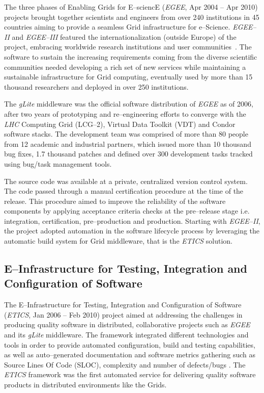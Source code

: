 \documentclass[journal]{IEEEtran}
\begin{document}
The three phases of Enabling Grids for E--sciencE ({\sl EGEE}, Apr 2004 -- Apr 2010)
\cite{cordis:egee,cordis:egee2,cordis:egee3} projects brought together
scientists and engineers from over 240 institutions in 45 countries aiming to
provide a seamless Grid infrastructure for e--Science. {\sl EGEE--II} and {\sl EGEE--III}
featured the internationalization (outside Europe) of the project, embracing worldwide research
institutions and user communities~\cite{egee}. The software to sustain the increasing
requirements coming from the diverse scientific communities needed developing a
rich set of new services while maintaining a sustainable infrastructure for
Grid computing, eventually used by more than 15 thousand researchers and deployed in
over 250 institutions.

The {\sl gLite} middleware \cite{glite} was the
official software distribution of {\sl EGEE} as of 2006, after two years of prototyping and
re--engineering efforts to converge with the {\sl LHC} Computing Grid (LCG--2), Virtual
Data Toolkit (VDT) and Condor \cite{condor} software stacks. The
development team was comprised of more than 80 people from 12 academic and
industrial partners, which issued more than 10 thousand bug fixes, 1.7 thousand patches and
defined over 300 development tasks tracked using bug/task management tools.

The source code was available at a private, centralized version control system.
The code passed through a manual certification procedure at the time of the release.
This procedure aimed to improve the reliability of the software components by applying
acceptance criteria checks at the pre--release stage
\cite{egee:acceptance-criteria} i.e. integration, certification, pre--production and
production. Starting with {\sl EGEE--II}, the project adopted automation in the software
lifecycle process by leveraging the automatic build system for Grid middleware, that is
the {\sl ETICS} \cite{etics} solution.

\subsection{E--Infrastructure for Testing, Integration and Configuration of Software}

The E--Infrastructure for Testing, Integration and Configuration of Software~\cite{etics}
({\sl ETICS}, Jan 2006 -- Feb 2010) project aimed
at addressing the challenges in producing quality software in distributed,
collaborative projects such as {\sl EGEE} and its {\sl gLite} middleware. The framework
integrated different technologies and tools in order to provide automated configuration,
build and testing capabilities, as well as auto--generated documentation and
software metrics gathering such as Source Lines Of Code (SLOC), complexity and
number of defects/bugs \cite{etics}. The {\sl ETICS} framework was the first automated
service for delivering quality software products in distributed environments like
the Grids.
\end{document}

